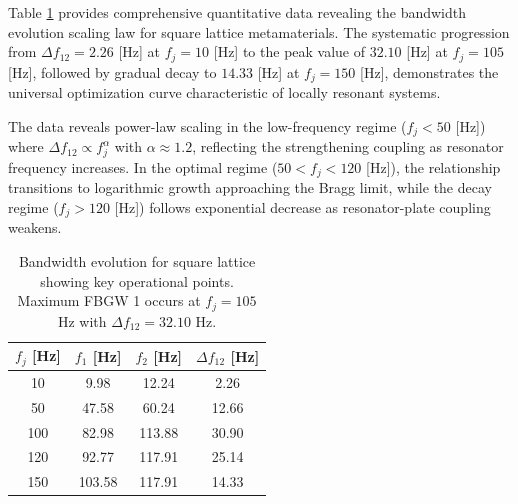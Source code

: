 \documentclass[review,numbers,sort&compress]{elsarticle}
\begin{document}
Table \ref{tab_square_latice_fbgw} provides comprehensive quantitative data revealing the bandwidth evolution scaling law for square lattice metamaterials. The systematic progression from $\Delta f_{12} = 2.26$ [Hz] at $f_j = 10$ [Hz] to the peak value of $32.10$ [Hz] at $f_j = 105$ [Hz], followed by gradual decay to $14.33$ [Hz] at $f_j = 150$ [Hz], demonstrates the universal optimization curve characteristic of locally resonant systems.

The data reveals power-law scaling in the low-frequency regime ($f_j < 50$ [Hz]) where $\Delta f_{12} \propto f_j^{\alpha}$ with $\alpha \approx 1.2$, reflecting the strengthening coupling as resonator frequency increases. In the optimal regime ($50 < f_j < 120$ [Hz]), the relationship transitions to logarithmic growth approaching the Bragg limit, while the decay regime ($f_j > 120$ [Hz]) follows exponential decrease as resonator-plate coupling weakens.

\begin{table}[htb]
    \centering
    \caption{Bandwidth evolution for square lattice showing key operational points. Maximum FBGW 1 occurs at $f_j = 105$ Hz with $\Delta f_{12} = 32.10$ Hz.}
    \label{tab_square_latice_fbgw}
    \begin{tabular}{cccc}
        \hline
        $f_j$ [Hz] & $f_1$ [Hz] & $f_2$ [Hz] & $\Delta f_{12}$ [Hz] \\
        \hline
        10  & 9.98  & 12.24  & 2.26 \\
        50  & 47.58 & 60.24  & 12.66 \\
        100 & 82.98  & 113.88 & 30.90 \\
        120 & 92.77  & 117.91 & 25.14 \\
        150 & 103.58 & 117.91 & 14.33 \\
        \hline
    \end{tabular}
\end{table}
\end{document}
